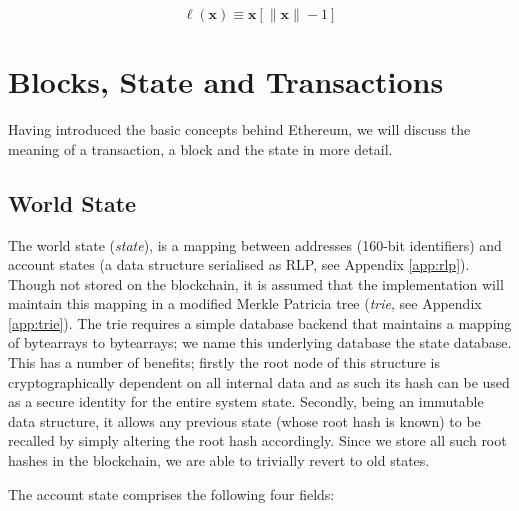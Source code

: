 \documentclass[9pt,oneside]{amsart}
\begin{document}
\begin{multicols}{2}
\begin{equation}
\ell(\mathbf{x}) \equiv \mathbf{x}[\lVert \mathbf{x} \rVert - 1]
\end{equation}

\section{Blocks, State and Transactions} \label{ch:bst}

Having introduced the basic concepts behind Ethereum, we will discuss the meaning of a transaction, a block and the state in more detail.

\subsection{World State} \label{ch:state}

The world state (\textit{state}), is a mapping between addresses (160-bit identifiers) and account states (a data structure serialised as RLP, see Appendix \ref{app:rlp}). Though not stored on the blockchain, it is assumed that the implementation will maintain this mapping in a modified Merkle Patricia tree (\textit{trie}, see Appendix \ref{app:trie}). The trie requires a simple database backend that maintains a mapping of bytearrays to bytearrays; we name this underlying database the state database. This has a number of benefits; firstly the root node of this structure is cryptographically dependent on all internal data and as such its hash can be used as a secure identity for the entire system state. Secondly, being an immutable data structure, it allows any previous state (whose root hash is known) to be recalled by simply altering the root hash accordingly. Since we store all such root hashes in the blockchain, we are able to trivially revert to old states.

The account state comprises the following four fields:


\end{multicols}
\end{document}
